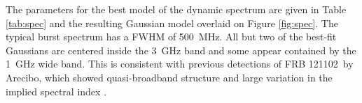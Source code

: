 \documentclass[twocolumn]{aastex61}
\newcommand{\frb}{FRB 121102}
\begin{document}
The parameters for the best model of the dynamic spectrum are given in Table \ref{tab:spec} and the resulting Gaussian model overlaid on Figure \ref{fig:spec}. The typical burst spectrum has a FWHM of 500~MHz. All but two of the best-fit Gaussians are centered inside the 3~GHz band and some appear contained by the 1~GHz wide band. This is consistent with previous detections of \frb\ by Arecibo, which showed quasi-broadband structure \citep{2016arXiv160308880S} and large variation in the implied spectral index \citep{2014ApJ...790..101S}. 



\end{document}

